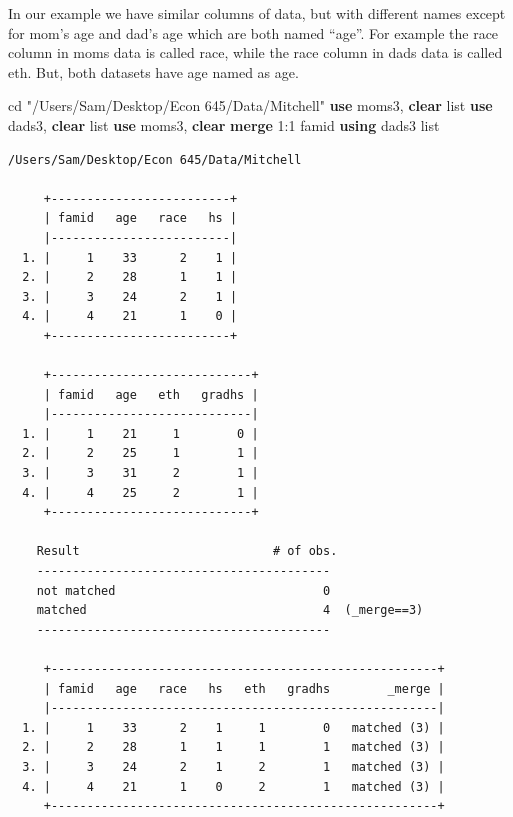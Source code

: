 \documentclass[
]{book}
\newenvironment{Shaded}{\begin{snugshade}}{\end{snugshade}}
\newcommand{\KeywordTok}[1]{\textcolor[rgb]{0.13,0.29,0.53}{\textbf{#1}}}
\newcommand{\NormalTok}[1]{#1}
\newcommand{\OtherTok}[1]{\textcolor[rgb]{0.56,0.35,0.01}{#1}}
\newcommand{\StringTok}[1]{\textcolor[rgb]{0.31,0.60,0.02}{#1}}
\begin{document}
In our example we have similar columns of data, but with different names except for mom's age and dad's age which are both named ``age''. For example the race column in moms data is called race, while the race column in dads data is called eth. But, both datasets have age named as age.

\begin{Shaded}
\begin{Highlighting}[]
\NormalTok{cd }\StringTok{"/Users/Sam/Desktop/Econ 645/Data/Mitchell"}
\KeywordTok{use}\NormalTok{ moms3, }\KeywordTok{clear}
\OtherTok{list}
\KeywordTok{use}\NormalTok{ dads3, }\KeywordTok{clear}
\OtherTok{list}
\KeywordTok{use}\NormalTok{ moms3, }\KeywordTok{clear}
\KeywordTok{merge}\NormalTok{ 1:1 famid }\KeywordTok{using}\NormalTok{ dads3}
\OtherTok{list}
\end{Highlighting}
\end{Shaded}

\begin{verbatim}
/Users/Sam/Desktop/Econ 645/Data/Mitchell

     +-------------------------+
     | famid   age   race   hs |
     |-------------------------|
  1. |     1    33      2    1 |
  2. |     2    28      1    1 |
  3. |     3    24      2    1 |
  4. |     4    21      1    0 |
     +-------------------------+

     +----------------------------+
     | famid   age   eth   gradhs |
     |----------------------------|
  1. |     1    21     1        0 |
  2. |     2    25     1        1 |
  3. |     3    31     2        1 |
  4. |     4    25     2        1 |
     +----------------------------+

    Result                           # of obs.
    -----------------------------------------
    not matched                             0
    matched                                 4  (_merge==3)
    -----------------------------------------

     +------------------------------------------------------+
     | famid   age   race   hs   eth   gradhs        _merge |
     |------------------------------------------------------|
  1. |     1    33      2    1     1        0   matched (3) |
  2. |     2    28      1    1     1        1   matched (3) |
  3. |     3    24      2    1     2        1   matched (3) |
  4. |     4    21      1    0     2        1   matched (3) |
     +------------------------------------------------------+
\end{verbatim}
\end{document}
